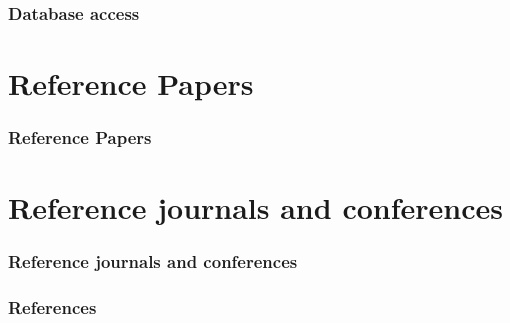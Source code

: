 \documentclass{beamer}
\begin{document}
\begin{frame}
\frametitle{Database access}
\end{frame}

\section{Reference Papers}


\begin{frame}
\frametitle{Reference Papers}
\end{frame}

\section{Reference journals and conferences}

\begin{frame}
\frametitle{Reference journals and conferences}
\end{frame}

\begin{frame}[allowframebreaks]
        \frametitle{References}
        
        
\end{frame}
\end{document}
